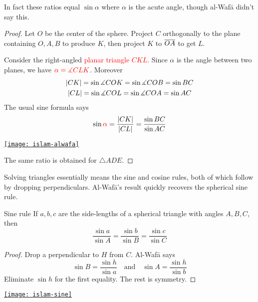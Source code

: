 In fact these ratios equal $\sin\alpha$ where $\alpha$ is the acute angle, though al-Wafā didn't say this.

\begin{proof}
	Let $O$ be the center of the sphere. Project $C$ orthogonally to the plane containing $O,A,B$ to produce $K$, then project $K$ to $\overline{OA}$ to get $L$.\par
	\begin{minipage}[t]{0.55\linewidth}\vspace{-5pt}
		Consider the right-angled \textcolor{red}{planar triangle $CKL$.} Since $\alpha$ is the angle between two planes, we have $\textcolor{red}{\alpha=\measuredangle CLK}$. Moreover
		\begin{gather*}
		\left| CK\right|=\sin\measuredangle COK=\sin\measuredangle COB=\sin BC\\
		\left| CL\right|=\sin\measuredangle COL=\sin\measuredangle COA=\sin AC
		\end{gather*}
		The usual sine formula says
		\[
			\sin\textcolor{red}{\alpha}=\frac{\left| CK\right|}{\left| CL\right|}=\frac{\sin BC}{\sin AC}
		\]
	\end{minipage}
	\hfill
	\begin{minipage}[t]{0.4\linewidth}\vspace{-15pt}
		\flushright
		\href{http://math.uci.edu/~ndonalds/math184/islam-alwafa.html}{\texttt{[image: islam-alwafa]}}
	\end{minipage}
	\par\vspace{-3pt}
	The same ratio is obtained for $\triangle ADE$.
\end{proof}

\goodbreak

Solving triangles essentially means the sine and cosine rules, both of which follow by dropping perpendiculars. Al-Wafā's result quickly recovers the spherical sine rule.

\begin{minipage}[t]{0.65\linewidth}\vspace{0pt}
	\begin{cor*}{Sine rule}{}
	If $a,b,c$ are the side-lengths of a spherical triangle with angles $A,B,C$, then
	\[\frac{\sin a}{\sin A}=\frac{\sin b}{\sin B}=\frac{\sin c}{\sin C}\]
	\end{cor*}
	
	\begin{proof}
	Drop a perpendicular to $H$ from $C$. Al-Wafā says
	\[\sin B=\frac{\sin h}{\sin a}\quad\text{and}\quad \sin A=\frac{\sin h}{\sin b}\]
	Eliminate $\sin h$ for the first equality. The rest is symmetry.
	\end{proof}
\end{minipage}
\hfill
\begin{minipage}[t]{0.34\linewidth}\vspace{0pt}
	\flushright
	\href{http://math.uci.edu/~ndonalds/math184/islam-sine.html}{\texttt{[image: islam-sine]}}
\end{minipage}
\medbreak

